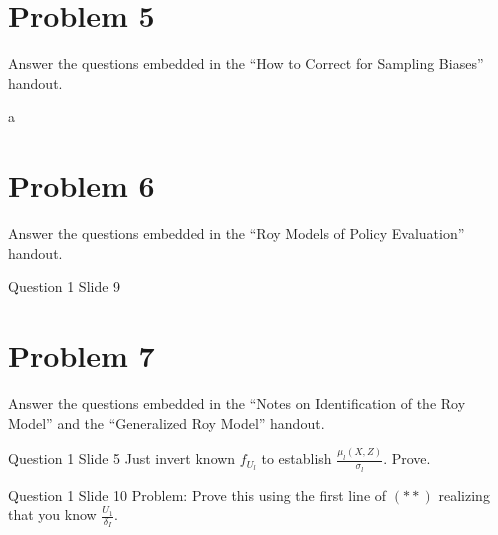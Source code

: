 \documentclass{article}
\begin{document}
\section*{Problem 5}
Answer the questions embedded in the ``How to Correct for Sampling Biases'' handout.

\begin{problem}{a}
\end{problem}
\begin{solution}
\end{solution}

\newpage

\section*{Problem 6}
Answer the questions embedded in the ``Roy Models of Policy Evaluation'' handout.

\begin{problem}{Question 1 Slide 9}
\end{problem}
\begin{solution}
\end{solution}


\newpage

\section*{Problem 7}
Answer the questions embedded in the ``Notes on Identification of the Roy Model'' and the ``Generalized Roy Model'' handout.

\begin{problem}{Question 1 Slide 5}
Just invert known $f_{U_{l}}$ to establish $\frac{\mu_{l}(X, Z)}{\sigma_{l}}$. Prove.
\end{problem}
\begin{solution}
\end{solution}

\begin{problem}{Question 1 Slide 10}
Problem: Prove this using the first line of $(* *)$ realizing that you know $\frac{U_{1}}{\delta_{I}}$.
\end{problem}
\begin{solution}
\end{solution}
\end{document}
